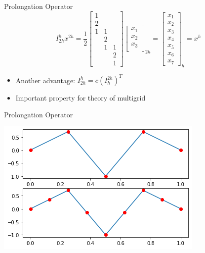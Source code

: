 \documentclass[11pt]{beamer}
\begin{document}
\begin{frame}{Prolongation Operator}
  \[
    I_{2h}^h x^{2h} = \frac{1}{2} 
    \begin{bmatrix}
      1 & & \\
      2 & & \\
      1 & 1 & \\
      & 2 & \\
      & 1 & 1 \\
      & & 2 \\
      & & 1
    \end{bmatrix}
    \begin{bmatrix}
      x_1 \\ x_2 \\ x_3 \\
    \end{bmatrix}_{2h}
    = \begin{bmatrix}
      x_1 \\ x_2 \\ x_3 \\ x_4 \\ x_5 \\ x_6 \\ x_7
    \end{bmatrix}_h = x^h
  \]
  \begin{itemize}
  \item Another advantage: \(I_{2h}^h = c(I_h^{2h})^T\)
  \item Important property for theory of multigrid
  \end{itemize}
\end{frame}
\begin{frame}{Prolongation Operator}
  \begin{center}
    \includegraphics[width=\linewidth]{output_24_1.png}
  \end{center}
\end{frame}
\end{document}
